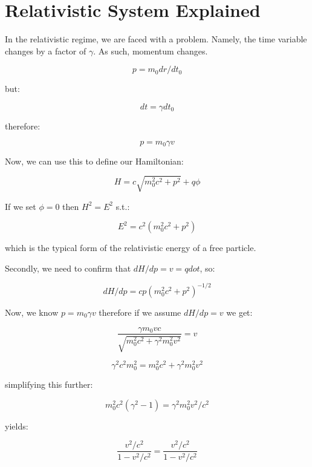 \documentclass[twoside]{article}
\begin{document}
\section{Relativistic System Explained}

In the relativistic regime, we are faced with a problem. Namely, the time variable changes by a factor of $\gamma$. As such, momentum changes.

$$ p = m_0 dr/dt_0 $$

but:

$$ dt = \gamma dt_0$$

therefore:

$$ p = m_0\gamma v$$

Now, we can use this to define our Hamiltonian:

$$ H = c \sqrt{m_0^2c^2 + p^2} + q\phi $$

If we set $\phi = 0$ then $H^2 = E^2$ s.t.:

$$ E^2 = c^2(m_0^2c^2 + p^2) $$

which is the typical form of the relativistic energy of a free particle.

Secondly, we need to confirm that $dH/dp = v = qdot$, so:

$$ dH/dp = cp(m_0^2c^2 + p^2)^{-1/2} $$

Now, we know $ p = m_0 \gamma v $ therefore if we assume $ dH/dp = v $ we get:

$$ \frac{\gamma m_0 vc}{\sqrt{m_0^2c^2 + \gamma^2m_0^2v^2}} = v $$

$$ \gamma^2 c^2 m_0^2 = m_0^2 c^2 + \gamma^2 m_0^2 v^2 $$

simplifying this further:

$$ m_0^2c^2 (\gamma^2 -1) = \gamma^2 m_0^2 v^2/c^2 $$

yields:

$$ \frac{v^2/c^2}{1-v^2/c^2} = \frac{v^2/c^2}{1-v^2/c^2} $$
\end{document}
